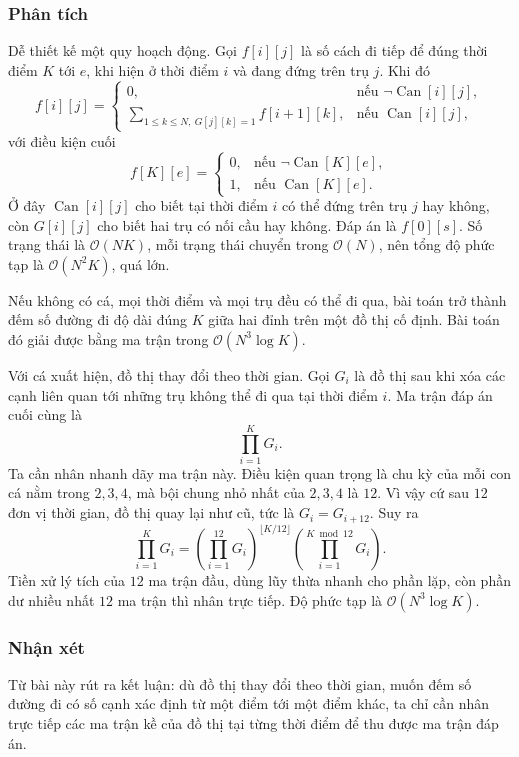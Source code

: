 \documentclass[11pt]{article}
\newcommand{\Oh}{\mathcal{O}}
\newcommand{\Can}{\operatorname{Can}}
\begin{document}
\subsubsection{Phân tích}

Dễ thiết kế một quy hoạch động. Gọi \(f[i][j]\) là số cách đi tiếp để đúng thời
điểm \(K\) tới \(e\), khi hiện ở thời điểm \(i\) và đang đứng trên trụ \(j\).
Khi đó
\[
  f[i][j]=
  \begin{cases}
    0, & \text{nếu } \neg\Can[i][j],\\
    \sum_{1\le k\le N,\ G[j][k]=1} f[i+1][k],
       & \text{nếu } \Can[i][j],
  \end{cases}
\]
với điều kiện cuối
\[
  f[K][e]=
  \begin{cases}
    0, & \text{nếu } \neg\Can[K][e],\\
    1, & \text{nếu } \Can[K][e].
  \end{cases}
\]
Ở đây \(\Can[i][j]\) cho biết tại thời điểm \(i\) có thể đứng trên trụ \(j\)
hay không, còn \(G[i][j]\) cho biết hai trụ có nối cầu hay không. Đáp án là
\(f[0][s]\). Số trạng thái là \(\Oh(NK)\), mỗi trạng thái chuyển trong
\(\Oh(N)\), nên tổng độ phức tạp là \(\Oh(N^2K)\), quá lớn.

Nếu không có cá, mọi thời điểm và mọi trụ đều có thể đi qua, bài toán trở
thành đếm số đường đi độ dài đúng \(K\) giữa hai đỉnh trên một đồ thị cố định.
Bài toán đó giải được bằng ma trận trong \(\Oh(N^3\log K)\).

Với cá xuất hiện, đồ thị thay đổi theo thời gian. Gọi \(G_i\) là đồ thị sau
khi xóa các cạnh liên quan tới những trụ không thể đi qua tại thời điểm \(i\).
Ma trận đáp án cuối cùng là
\[
  \prod_{i=1}^{K} G_i.
\]
Ta cần nhân nhanh dãy ma trận này. Điều kiện quan trọng là chu kỳ của mỗi con
cá nằm trong \(2,3,4\), mà bội chung nhỏ nhất của \(2,3,4\) là \(12\). Vì vậy
cứ sau \(12\) đơn vị thời gian, đồ thị quay lại như cũ, tức là \(G_i=G_{i+12}\).
Suy ra
\[
  \prod_{i=1}^{K}G_i
  =
  \left(\prod_{i=1}^{12}G_i\right)^{\lfloor K/12\rfloor}
  \left(\prod_{i=1}^{K\bmod 12}G_i\right).
\]
Tiền xử lý tích của \(12\) ma trận đầu, dùng lũy thừa nhanh cho phần lặp, còn
phần dư nhiều nhất \(12\) ma trận thì nhân trực tiếp. Độ phức tạp là
\(\Oh(N^3\log K)\).

\subsubsection{Nhận xét}

Từ bài này rút ra kết luận: dù đồ thị thay đổi theo thời gian, muốn đếm số
đường đi có số cạnh xác định từ một điểm tới một điểm khác, ta chỉ cần nhân
trực tiếp các ma trận kề của đồ thị tại từng thời điểm để thu được ma trận đáp
án.
\end{document}
